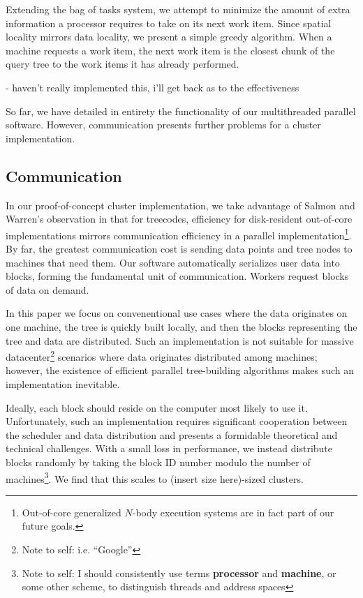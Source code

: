 \documentclass[times, leqno,twocolumn]{article}
\newcommand{\authornote}[1]{\footnote{Note to self: #1}}
\newcommand{\authorsnote}[1]{\authornote{#1}}
\newcommand{\defterm}[1]{{\bf #1}}
\begin{document}
Extending the bag of tasks system, we attempt to minimize the amount of extra information a processor requires to take on its next work item.
Since spatial locality mirrors data locality, we present a simple greedy algorithm.
When a machine requests a work item, the next work item is the closest chunk of the query tree to the work items it has already performed.

- haven't really implemented this, i'll get back as to the effectiveness


So far, we have detailed in entirety the functionality of our multithreaded parallel software.
However, communication presents further problems for a cluster implementation.

\subsection{Communication}

In our proof-of-concept cluster implementation, we take advantage of Salmon and Warren's observation in \cite{salmon97parallel} that for treecodes, efficiency for disk-resident out-of-core implementations mirrors communication efficiency in a parallel implementation\footnote{Out-of-core generalized $N$-body execution systems are in fact part of our future goals.}.
By far, the greatest communication cost is sending data points and tree nodes to machines that need them.
Our software automatically serializes user data into blocks, forming the fundamental unit of communication.
Workers request blocks of data on demand.

In this paper we focus on convenentional use cases where the data originates on one machine, the tree is quickly built locally, and then the blocks representing the tree and data are distributed.
Such an implementation is not suitable for massive datacenter\authorsnote{i.e. ``Google''} scenarios where data originates distributed among machines; however, the existence of efficient parallel tree-building algorithms \cite{alfuraih00parallel} makes such an implementation inevitable.

Ideally, each block should reside on the computer most likely to use it.
Unfortunately, such an implementation requires significant cooperation between the scheduler and data distribution and presents a formidable theoretical and technical challenges.
With a small loss in performance, we instead distribute blocks randomly by taking the block ID number modulo the number of machines\authorsnote{I should consistently use terms \defterm{processor} and \defterm{machine}, or some other scheme, to distinguish threads and address spaces}.
We find that this scales to (insert size here)-sized clusters.
\end{document}
